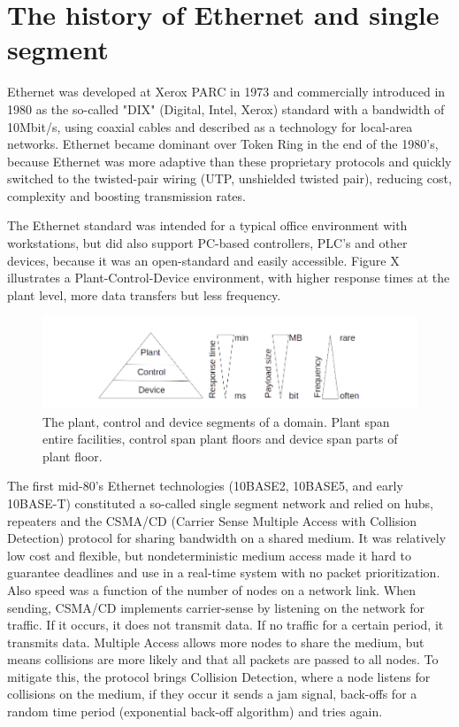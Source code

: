 \section{The history of Ethernet and single segment}

Ethernet was developed at Xerox PARC in 1973 and commercially introduced in 1980 as the so-called "DIX" (Digital, Intel, Xerox) standard with a bandwidth of 10Mbit/s, using coaxial cables and described as a technology for local-area networks. Ethernet became dominant over Token Ring in the end of the 1980's, because Ethernet was more adaptive than these proprietary protocols and quickly switched to the twisted-pair wiring (UTP, unshielded twisted pair), reducing cost, complexity and boosting transmission rates.

\noindent The Ethernet standard was intended for a typical office environment with workstations, but did also support PC-based controllers, PLC's and other devices, because it was an open-standard and easily accessible. Figure X illustrates a Plant-Control-Device environment, with higher response times at the plant level, more data transfers but less frequency.

\begin{figure}[h!]\label{}
	\centering
	\includegraphics[scale=0.5]{realTimeEthernet/PlantControlDevice.png}
	\caption{The plant, control and device segments of a domain. Plant span entire facilities, control span plant floors and device span parts of plant floor.}
	\label{fig:plantcontroldevice}
\end{figure}

\noindent The first mid-80's Ethernet technologies (10BASE2, 10BASE5, and early 10BASE-T) constituted a so-called single segment network and relied on hubs, repeaters and the CSMA/CD (Carrier Sense Multiple Access with Collision Detection) protocol for sharing bandwidth on a shared medium. It was relatively low cost and flexible, but nondeterministic medium access made it hard to guarantee deadlines and use in a real-time system with no packet prioritization. Also speed was a function of the number of nodes on a network link. When sending, CSMA/CD implements carrier-sense by listening on the network for traffic. If it occurs, it does not transmit data. If no traffic for a certain period, it transmits data. Multiple Access allows more nodes to share the medium, but means collisions are more likely and that all packets are passed to all nodes. To mitigate this, the protocol brings Collision Detection, where a node listens for collisions on the medium, if they occur it sends a jam signal, back-offs for a random time period (exponential back-off algorithm) and tries again.

